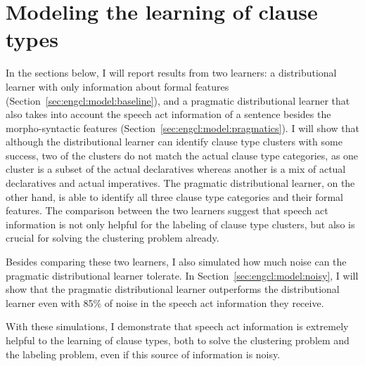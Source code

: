 


\section{Modeling the learning of clause types}
\label{sec:engcl:model}

In the sections below, I will report results from two learners: a distributional learner with only information about formal features (Section~\ref{sec:engcl:model:baseline}), and a pragmatic distributional learner that also takes into account the speech act information of a sentence besides the morpho-syntactic features (Section~\ref{sec:engcl:model:pragmatics}). I will show that although the distributional learner can identify clause type clusters with some success, two of the clusters do not match the actual clause type categories, as one cluster is a subset of the actual declaratives whereas another is a mix of actual declaratives and actual imperatives. The pragmatic distributional learner, on the other hand, is able to identify all three clause type categories and their formal features. The comparison between the two learners suggest that speech act information is not only helpful for the labeling of clause type clusters, but also is crucial for solving the clustering problem already. 

Besides comparing these two learners, I also simulated how much noise can the pragmatic distributional learner tolerate. In Section~\ref{sec:engcl:model:noisy}, I will show that the pragmatic distributional learner outperforms the distributional learner even with 85\% of noise in the speech act information they receive. 

With these simulations, I demonstrate that speech act information is extremely helpful to the learning of clause types, both to solve the clustering problem and the labeling problem, even if this source of information is noisy.








